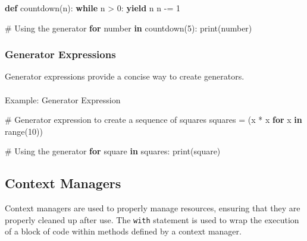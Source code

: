 \documentclass[
  letterpaper,
  DIV=11,
  numbers=noendperiod]{scrreprt}
\makeatletter
\let\oldparagraph\paragraph
\renewcommand{\paragraph}{
    \@ifstar
      \xxxParagraphStar
      \xxxParagraphNoStar
  }
\newcommand{\xxxParagraphStar}[1]{\oldparagraph*{#1}\mbox{}}
\newcommand{\xxxParagraphNoStar}[1]{\oldparagraph{#1}\mbox{}}
\newenvironment{Shaded}{\begin{snugshade}}{\end{snugshade}}
\newcommand{\BuiltInTok}[1]{\textcolor[rgb]{0.00,0.23,0.31}{#1}}
\newcommand{\CommentTok}[1]{\textcolor[rgb]{0.37,0.37,0.37}{#1}}
\newcommand{\ControlFlowTok}[1]{\textcolor[rgb]{0.00,0.23,0.31}{\textbf{#1}}}
\newcommand{\DecValTok}[1]{\textcolor[rgb]{0.68,0.00,0.00}{#1}}
\newcommand{\KeywordTok}[1]{\textcolor[rgb]{0.00,0.23,0.31}{\textbf{#1}}}
\newcommand{\NormalTok}[1]{\textcolor[rgb]{0.00,0.23,0.31}{#1}}
\newcommand{\OperatorTok}[1]{\textcolor[rgb]{0.37,0.37,0.37}{#1}}
\makeatother
\begin{document}
\begin{Shaded}
\begin{Highlighting}[]
\KeywordTok{def}\NormalTok{ countdown(n):}
    \ControlFlowTok{while}\NormalTok{ n }\OperatorTok{\textgreater{}} \DecValTok{0}\NormalTok{:}
        \ControlFlowTok{yield}\NormalTok{ n}
\NormalTok{        n }\OperatorTok{{-}=} \DecValTok{1}

\CommentTok{\# Using the generator}
\ControlFlowTok{for}\NormalTok{ number }\KeywordTok{in}\NormalTok{ countdown(}\DecValTok{5}\NormalTok{):}
    \BuiltInTok{print}\NormalTok{(number)}
\end{Highlighting}
\end{Shaded}

\subsubsection{Generator Expressions}\label{generator-expressions}

Generator expressions provide a concise way to create generators.

\paragraph{Example: Generator
Expression}\label{example-generator-expression}

\begin{Shaded}
\begin{Highlighting}[]
\CommentTok{\# Generator expression to create a sequence of squares}
\NormalTok{squares }\OperatorTok{=}\NormalTok{ (x }\OperatorTok{*}\NormalTok{ x }\ControlFlowTok{for}\NormalTok{ x }\KeywordTok{in} \BuiltInTok{range}\NormalTok{(}\DecValTok{10}\NormalTok{))}

\CommentTok{\# Using the generator}
\ControlFlowTok{for}\NormalTok{ square }\KeywordTok{in}\NormalTok{ squares:}
    \BuiltInTok{print}\NormalTok{(square)}
\end{Highlighting}
\end{Shaded}

\subsection{Context Managers}\label{context-managers}

Context managers are used to properly manage resources, ensuring that
they are properly cleaned up after use. The \texttt{with} statement is
used to wrap the execution of a block of code within methods defined by
a context manager.
\end{document}
